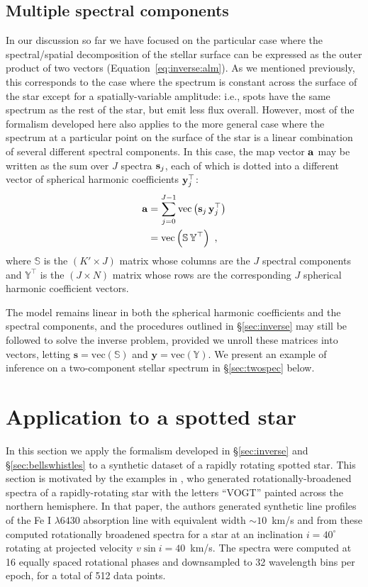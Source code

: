 \documentclass[modern]{aastex631}
\begin{document}
\subsection{Multiple spectral components}
\label{sec:eigen}
%
In our discussion so far we have focused on the particular case where the spectral/spatial decomposition of the stellar surface can be expressed as the outer product of two vectors (Equation~\ref{eq:inverse:alm}). 
As we mentioned previously, this corresponds to the case where the spectrum is constant across the surface of the star except for a spatially-variable amplitude: i.e., spots have the same spectrum as the rest of the star, but emit less flux overall. 
However, most of the formalism developed here also applies to the more general case where the spectrum at a particular point on the surface of the star is a linear combination of several different spectral components. 
In this case, the map vector ${\mathbf{a}}$ may be written as the sum over $J$ spectra ${\mathbf{s}}_j$, each of which is dotted into a different vector of spherical harmonic coefficients ${\mathbf{y}}_j^\top$:
%
\begin{align}
    \label{eq:eigen:alm}
    {\ensuremath{\mathbf{a}}}
     & =
    \sum_{j=0}^{J-1}\mathrm{vec}\left( {\mathbf{s}}_j \, {\mathbf{y}}_j^\top \right) \\
     & =
    \mathrm{vec}\left( \boldsymbol{\mathbb{S}} \, \boldsymbol{\mathbb{Y}}^\top \right) \hskip 0.33em,
\end{align}
%
where $\boldsymbol{\mathbb{S}}$ is the $(K' \times J)$ matrix whose columns are the $J$ spectral components and $\boldsymbol{\mathbb{Y}}^\top$ is the $(J \times N)$ matrix whose rows are the corresponding $J$ spherical harmonic coefficient vectors.

The model remains linear in both the spherical harmonic coefficients and the spectral components, and the procedures outlined in \S\ref{sec:inverse} may still be followed to solve the inverse problem, provided we unroll these matrices into vectors, letting $\mathbf{s} = \mathrm{vec}(\boldsymbol{\mathbb{S}})$ and $\mathbf{y} = \mathrm{vec}(\boldsymbol{\mathbb{Y}})$.
We present an example of inference on a two-component stellar spectrum in \S\ref{sec:twospec} below.

\section{Application to a spotted star}
\label{sec:spotstar}

In this section we apply the formalism developed in \S\ref{sec:inverse} and \S\ref{sec:bellswhistles} to a synthetic dataset of a rapidly rotating spotted star. 
This section is motivated by the examples in \cite{Vogt1987}, who generated rotationally-broadened spectra of a rapidly-rotating star with the letters ``VOGT'' painted across the northern hemisphere. 
In that paper, the authors generated synthetic line profiles of the Fe I $\lambda 6430$ absorption line with equivalent width ${\sim}10$~km/s and from these computed rotationally broadened spectra for a star at an inclination $i=40^\circ$ rotating at projected velocity $v\sin i = 40$~km/s.
The spectra were computed at 16 equally spaced rotational phases and downsampled to 32 wavelength bins per epoch, for a total of 512 data points.
\end{document}
